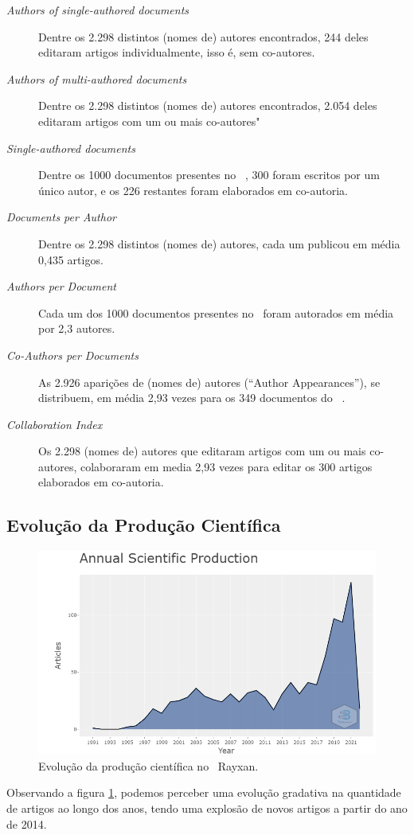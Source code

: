 \begin{description}
    \item [\textit{Authors of single-authored documents}] Dentre os 2.298 distintos (nomes de) autores encontrados, 244 deles editaram artigos individualmente, isso é, sem co-autores.
    \item [\textit{Authors of multi-authored documents}] Dentre os 2.298 distintos (nomes de) autores encontrados, 2.054 deles editaram artigos com um ou mais co-autores"
    \item [\textit{Single-authored documents}] Dentre os 1000 documentos presentes no \dataset\  , 300 foram escritos por um único autor, e os 226 restantes foram elaborados em co-autoria.
    \item [\textit{Documents per Author}] Dentre os 2.298 distintos (nomes de) autores, cada um publicou em média 0,435 artigos.
    \item [\textit{Authors per Document}] Cada um dos 1000 documentos presentes no \dataset\  foram autorados em média por  2,3 autores.
    \item [\textit{Co-Authors per Documents}] As 2.926 aparições de (nomes de) autores (``Author Appearances''), se distribuem, em média 2,93 vezes para os 349 documentos do \dataset\ .
    \item [\textit{Collaboration Index}] Os 2.298 (nomes de) autores que editaram artigos com um ou mais co-autores, colaboraram em media 2,93 vezes para editar os 300 artigos elaborados em co-autoria.
\end{description}

\subsection{Evolução da Produção Científica}

\begin{figure}
    \centering
    \includegraphics[width=1\textwidth]{experiments/Rayxan/PesqBibliogr/ComputacaoQuantica/WoS-20220206/AnnualScientific.png}
    \caption{Evolução da produção científica no \dataset\   Rayxan.}
    \label{fig:evol:anual:Rayxan}
\end{figure}

Observando a figura \ref{fig:evol:anual:Rayxan}, podemos perceber uma evolução gradativa na quantidade de artigos ao longo dos anos, tendo uma explosão de novos artigos a partir do ano de 2014.

